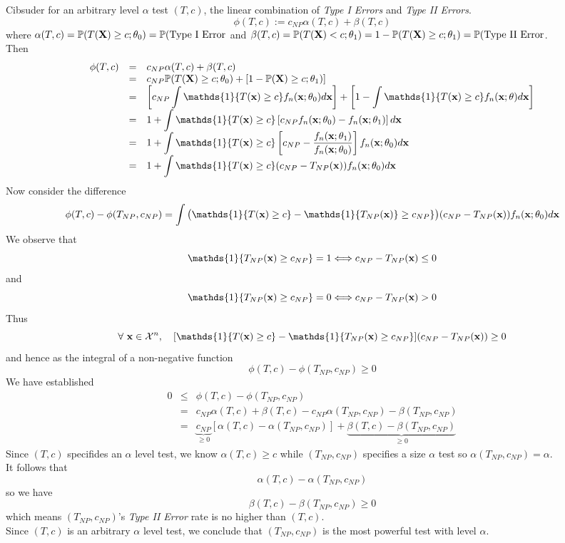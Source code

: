 \documentclass[11pt,a4paper]{article}
\begin{document}
Cibsuder for an arbitrary level $\alpha$ test $(T,c)$, the linear combination of \textit{Type I Errors} and \textit{Type II Errors}.
$$\phi(T,c):=c_{NP}\alpha(T,c)+\beta(T,c)$$
where $\alpha(T,c)=\mathbb{P}(T(\textbf{X})\geq c;\theta_0)=\mathbb{P}(\text{Type I Error}$ and $\beta(T,c)=\mathbb{P}(T(\textbf{X})<c;\theta_1)=1-\mathbb{P}(T(\textbf{X})\geq c;\theta_1)=\mathbb{P}(\text{Type II Error}$.\\
Then
\[\begin{array}{rcl}
\phi(T,c)&=&c_{NP}\alpha(T,c)+\beta(T,c)\\
&=&c_{NP}\prob(T(\X)\geq c;\theta_0)+[1-\prob(\X)\geq c;\theta_1)]\\
&=&{\displaystyle\left[c_{NP}\int\mathds{1}\{T(\x)\geq c\}f_n(\x;\theta_0)d\x\right]+\left[1-\int\mathds{1}\{T(\x)\geq c\}f_n(\x;\theta)d\x\right]}\\
&=&{\displaystyle1+\int\mathds{1}\{T(\x)\geq c\}\left[c_{NP}f_n(\x;\theta_0)-f_n(\x;\theta_1)\right]d\x}\\
&=&{\displaystyle 1+\int\mathds{1}\{T(\x)\geq c\}\left[c_{NP}-\dfrac{f_n(\x;\theta_1)}{f_n(\x;\theta_0)}\right]f_n(\x;\theta_0)d\x}\\
&=&{\displaystyle1+\int\mathds{1}\{T(\x)\geq c\}(c_{NP}-T_{NP}(\x))f_n(\x;\theta_0)d\x}
\end{array}\]
Now consider the difference
$$\phi(T,c)-\phi(T_{NP},c_{NP})=\int\big(\mathds{1}\{T(\x)\geq c\}-\mathds{1}\{T_{NP}(\x)\}\geq c_{NP}\}\big)(c_{NP}-T_{NP}(\x))f_n(\x;\theta_0)d\x$$
We observe that
$$\mathds{1}\{T_{NP}(\x)\geq c_{NP}\}=1\Longleftrightarrow c_{NP}-T_{NP}(\x)\leq0$$
and
$$\mathds{1}\{T_{NP}(\x)\geq c_{NP}\}=0\Longleftrightarrow c_{NP}-T_{NP}(\x)>0$$
Thus
$$\forall\ \x\in\mathcal{X}^n,\quad[\mathds{1}\{T(\x)\geq c\}-\mathds{1}\{T_{NP}(\x)\geq c_{NP}\}](c_{NP}-T_{NP}(\x))\geq 0$$
and hence as the integral of a non-negative function
$$\phi(T,c)-\phi(T_{NP},c_{NP})\geq0$$
We have established
\[\begin{array}{rcl}
0&\leq&\phi(T,c)-\phi(T_{NP},c_{NP})\\
&=&c_{NP}\alpha(T,c)+\beta(T,c)-c_{NP}\alpha(T_{NP},c_{NP})-\beta(T_{NP},c_{NP})\\
&=&\underbrace{c_{NP}}_{\geq0}[\alpha(T,c)-\alpha(T_{NP},c_{NP})]+\underbrace{\beta(T,c)-\beta(T_{NP},c_{NP})}_{\geq0}
\end{array}\]
Since $(T,c)$ specifides an $\alpha$ level test, we know $\alpha(T,c)\geq c$ while $(T_{NP},c_{NP})$ specifies a size $\alpha$ test so $\alpha(T_{NP},c_{NP})=\alpha$.\\
It follows that
$$\alpha(T,c)-\alpha(T_{NP},c_{NP})$$
so we have
$$\beta(T,c)-\beta(T_{NP},c_{NP})\geq0$$
which means $(T_{NP},c_{NP})$'s \textit{Type II Error} rate is no higher than $(T,c)$.\\
Since $(T,c)$ is an arbitrary $\alpha$ level test, we conclude that $(T_{NP},c_{NP})$ is the most powerful test with level $\alpha$.\proved\\
\end{document}
